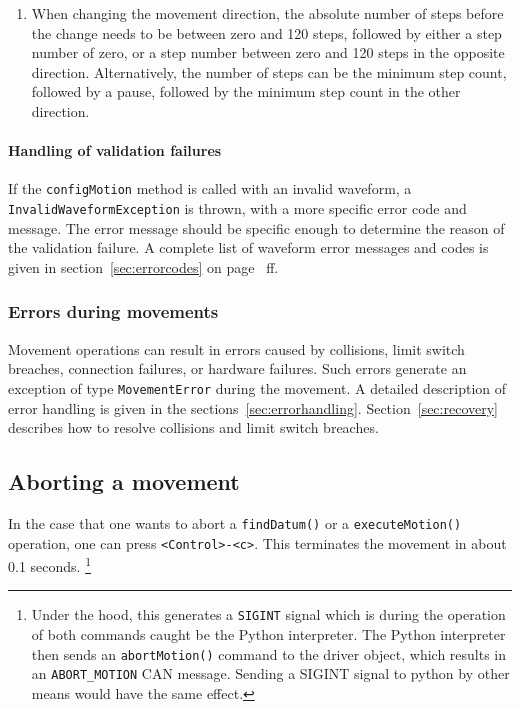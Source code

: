 \documentclass[11pt,a4paper]{report}
\begin{document}
\begin{enumerate}
\item When changing the movement direction, the absolute number of
  steps before the change needs to be between zero and 120 steps,
  followed by either a step number of zero, or a step number between
  zero and 120 steps in the opposite direction. Alternatively, the
  number of steps can be the minimum step count, followed by a pause,
  followed by the minimum step count in the other direction.

  
\end{enumerate}


\paragraph{Handling of validation failures}

\begin{sloppypar}
If the \texttt{configMotion} method is called with an invalid
waveform, a \texttt{InvalidWaveformException} is thrown, with a more
specific error code and message. The error message should be specific
enough to determine the reason of the validation failure.  A complete
list of waveform error messages and codes is given in
section~\ref{sec:errorcodes} on page~\pageref{sec:errorcodes} ff.
\end{sloppypar}

\subsubsection{Errors during movements}
Movement operations can result in errors caused by collisions, limit
switch breaches, connection failures, or hardware failures. Such
errors generate an exception of type \texttt{MovementError} during the
movement. A detailed description of error handling is given in the
sections~\ref{sec:errorhandling}. Section~\ref{sec:recovery} describes
how to resolve collisions and limit switch breaches.





\subsection{Aborting a movement}
  In the case
that one wants to abort a \texttt{findDatum()} or a
\texttt{executeMotion()} operation, one can press
\verb+<Control>-<c>+. This terminates the movement in about 0.1
seconds. \footnote{Under the hood, this generates a \texttt{SIGINT}
  signal which is during the operation of both commands caught be the
  Python interpreter. The Python interpreter then sends an
  \texttt{abortMotion()} command to the driver object, which results
  in an \texttt{ABORT\_MOTION} CAN message. Sending a SIGINT signal to
  python by other means would have the same effect.}
\end{document}
